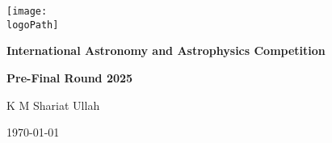 \documentclass[12pt]{article}
\newcommand{\participantName}{K M Shariat Ullah} %
\newcommand{\logoPath}{figures/logo_black_small.png}
\begin{document}
\begin{titlepage}
    \centering
    \vspace*{2cm}
    \texttt{[image: \\logoPath]}\par\vspace{1cm}
    {\large\bfseries International Astronomy and Astrophysics Competition\par}
    {\Large\bfseries Pre-Final Round 2025\par}
    \vspace{2cm}
    {\LARGE\participantName\par}
    \vfill
    \vspace{2cm}
    {\large \today\par}
\end{titlepage} 







\end{document}
